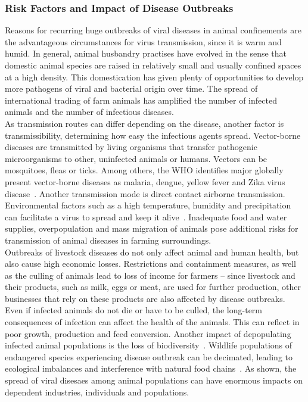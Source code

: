 \subsubsection*{Risk Factors and Impact of Disease Outbreaks}
Reasons for recurring huge outbreaks of viral diseases in animal confinements are the advantageous circumstances for virus transmission, since it is warm and humid. In general, animal husbandry practises have evolved in the sense that domestic animal species are raised in relatively small and usually confined spaces at a high density. This domestication has given plenty of opportunities to develop more pathogens of viral and bacterial origin over time. The spread of international trading of farm animals has amplified the number of infected animals and the number of infectious diseases. \\
As transmission routes can differ depending on the disease, another factor is transmissibility, determining how easy the infectious agents spread. Vector-borne diseases are transmitted by living organisms that transfer pathogenic microorganisms to other, uninfected animals or humans. Vectors can be mosquitoes, fleas or ticks. Among others, the \ac{WHO} identifies major globally present vector-borne diseases as malaria, dengue, yellow fever and Zika virus disease~\cite{world2017global}. Another transmission mode is direct contact airborne transmission. Environmental factors such as a high temperature, humidity and precipitation can facilitate a virus to spread and keep it alive~\cite{eccles2002explanation}. Inadequate food and water supplies, overpopulation and mass migration of animals pose additional risks for transmission of animal diseases in farming surroundings. \\
Outbreaks of livestock diseases do not only affect animal and human health, but also cause high economic losses. Restrictions and containment measures, as well as the culling of animals lead to loss of income for farmers -- since livestock and their products, such as milk, eggs or meat, are used for further production, other businesses that rely on these products are also affected by disease outbreaks. Even if infected animals do not die or have to be culled, the long-term consequences of infection can affect the health of the animals. This can reflect in poor growth, production and feed conversion. Another impact of depopulating infected animal populations is the loss of biodiversity~\cite{lacroix2014non, morand2020emerging}. Wildlife populations of endangered species experiencing disease outbreak can be decimated, leading to ecological imbalances and interference with natural food chains~\cite{reid2010global, civitello2015biodiversity, espinosa2020infectious}. As shown, the spread of viral disesaes among animal populations can have enormous impacts on dependent industries, individuals and populations.

